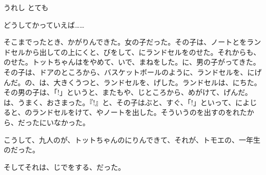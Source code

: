  うれし とても

 どうしてかっていえば……

 そこまでったとき、かがりんできた。女の子だった。その子は、ノートとをランドセルから出しての上にくと、びをして、にランドセルをのせた。それからも、のせた。トットちゃんはをやめて、いで、まねをした。に、男の子がってきた。その子は、ドアのところから、バスケットボールのように、ランドセルを、にげんだ。の、は、大きくうつと、ランドセルを、げした。ランドセルは、にちた。その男の子は、「!」というと、またもや、じところから、めがけて、げんだ。は、うまく、おさまった。『!』と、その子はぶと、すぐ、「!」といって、によじると、のランドセルをけて、やノートを出した。そういうのを出すのをれたから、だったにいなかった。

こうして、九人のが、トットちゃんのにりんできて、それが、トモエの、一年生のだった。

そしてそれは、じでをする、だった。


